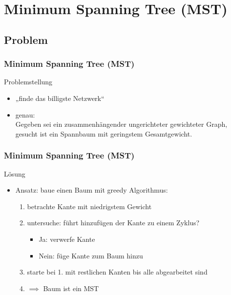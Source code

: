 \section{Minimum Spanning Tree (MST)}

\subsection{Problem}


\begin{frame}
\frametitle{Minimum Spanning Tree (MST)}
\begin{block}{Problemstellung}
\begin{itemize}
\item „finde das billigste Netzwerk“
\item genau: \\
Gegeben sei ein zusammenhängender ungerichteter gewichteter Graph, gesucht ist ein Spannbaum mit geringstem Gesamtgewicht.
\end{itemize}
\end{block}

\end{frame}

\begin{frame}
\frametitle{Minimum Spanning Tree (MST)}
\begin{block}{Lösung}
\begin{itemize}
\item Ansatz: baue einen Baum mit greedy Algorithmus:
\begin{enumerate}
\item betrachte Kante mit niedrigstem Gewicht
\item untersuche: führt hinzufügen der Kante zu einem Zyklus?
\begin{itemize}
\item Ja: verwerfe Kante
\item Nein: füge Kante zum Baum hinzu
\end{itemize}
\item starte bei 1. mit restlichen Kanten bis alle abgearbeitet sind
\item $ \implies $ Baum ist ein MST
\end{enumerate}
\end{itemize}
\end{block}

\end{frame}

